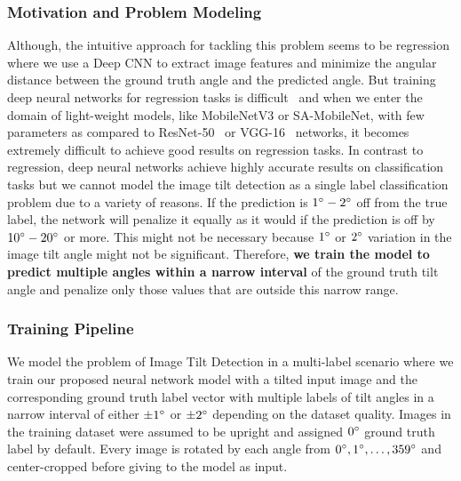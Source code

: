 \documentclass{bmvc2k}
\begin{document}
\subsubsection{Motivation and Problem Modeling}
\label{motivation}
Although, the intuitive approach for tackling this problem seems to be regression where we use a Deep CNN to extract image features and minimize the angular distance between the ground truth angle and the predicted angle. But training deep neural networks for regression tasks is difficult~\cite{reg1} and when we enter the domain of light-weight models, like MobileNetV3 or SA-MobileNet, with few parameters as compared to ResNet-50~\cite{resnet} or VGG-16~\cite{vgg} networks, it becomes extremely difficult to achieve good results on regression tasks. In contrast to regression, deep neural networks achieve highly accurate results on classification tasks but we cannot model the image tilt detection as a single label classification problem due to a variety of reasons. If the prediction is $1\degree-2\degree$ off from the true label, the network will penalize it equally as it would if the prediction is off by $10\degree-20\degree$ or more. This might not be necessary because $1\degree$ or $2\degree$ variation in the image tilt angle might not be significant. Therefore, \textbf{we train the model to predict multiple angles within a narrow interval} of the ground truth tilt angle and penalize only those values that are outside this narrow range.
\subsubsection{Training Pipeline}
We model the problem of Image Tilt Detection in a multi-label scenario where we train our proposed neural network model with a tilted input image and the corresponding ground truth label vector with multiple labels of tilt angles in a narrow interval of either $\pm 1\degree$ or $\pm 2\degree$ depending on the dataset quality. 
Images in the training dataset were assumed to be upright and assigned $0\degree$ ground truth label by default. Every image is rotated by each angle from $0\degree, 1\degree, \dots, 359\degree$ and center-cropped before giving to the model as input. 
\end{document}
